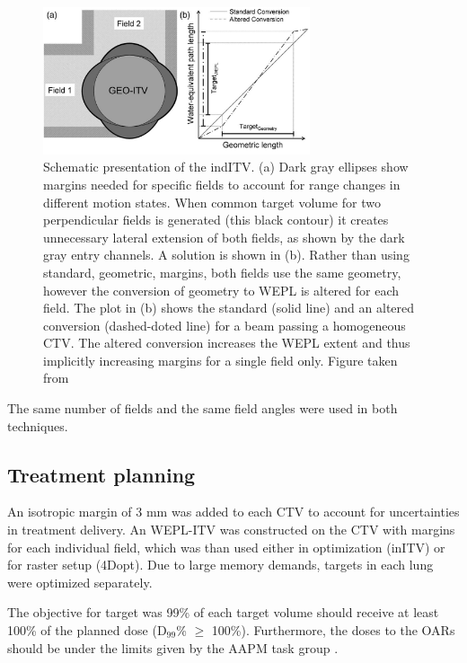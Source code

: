 \documentclass[type=dr, dr=rernat, accentcolor=tud7b,colorbacktitle, bigchapter, openright, twoside, 12pt ]{tudthesis}
\begin{document}
\begin{figure}[H]
	\begin{center}
		\includegraphics[width=0.7\textwidth]{./Images/weplITV.png}
		\caption{Schematic presentation of the indITV. (a) Dark gray ellipses show margins needed for specific fields to account for range changes in different motion states.
		When common target volume for two perpendicular fields is generated (this black contour) it creates unnecessary lateral extension of both fields, as shown by the dark gray
		entry channels. A solution is shown in (b). Rather than using standard, geometric, margins, both fields use the same geometry, however the conversion of geometry to WEPL
		is altered for each field. The plot in (b) shows the standard (solid line) and an altered conversion (dashed-doted line) for a beam passing a homogeneous CTV. The altered conversion
		increases the WEPL extent and thus implicitly increasing margins for a single field only. Figure taken from \cite{Graeff2012}}
		\label{Fig:weplITV}
	\end{center}
\end{figure}

The same number of fields and the same field angles were used in both techniques.



\subsection{Treatment planning}

An isotropic margin of 3 mm was added to each CTV to account for uncertainties in treatment delivery. An WEPL-ITV was constructed on the CTV with margins for each individual field, which was than used either in optimization (inITV)
or for raster setup (4Dopt). Due to large memory demands, targets in each lung were optimized separately. 
  
The objective for target was 99\% of each target volume should receive at least 100\% of the planned dose (D$_{99}$\% $\geq$ 100\%). Furthermore, the doses to the OARs should be under the limits given by the AAPM task group \cite{Benedict2010}. 
 
\end{document}
